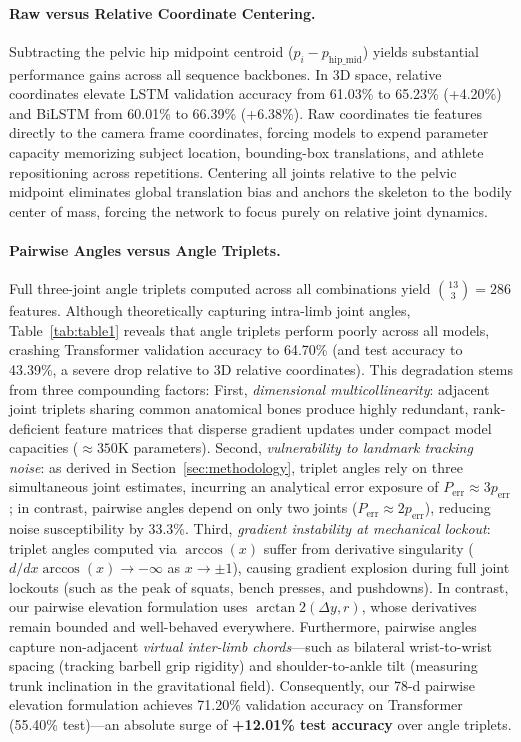 \documentclass[runningheads]{llncs}
\begin{document}
\paragraph{Raw versus Relative Coordinate Centering.} Subtracting the pelvic hip midpoint centroid ($p_i - p_{\text{hip\_mid}}$) yields substantial performance gains across all sequence backbones. In 3D space, relative coordinates elevate LSTM validation accuracy from 61.03\% to 65.23\% (+4.20\%) and BiLSTM from 60.01\% to 66.39\% (+6.38\%). Raw coordinates tie features directly to the camera frame coordinates, forcing models to expend parameter capacity memorizing subject location, bounding-box translations, and athlete repositioning across repetitions. Centering all joints relative to the pelvic midpoint eliminates global translation bias and anchors the skeleton to the bodily center of mass, forcing the network to focus purely on relative joint dynamics.

\paragraph{Pairwise Angles versus Angle Triplets.} Full three-joint angle triplets computed across all combinations yield $\binom{13}{3} = 286$ features. Although theoretically capturing intra-limb joint angles, Table~\ref{tab:table1} reveals that angle triplets perform poorly across all models, crashing Transformer validation accuracy to 64.70\% (and test accuracy to 43.39\%, a severe drop relative to 3D relative coordinates). This degradation stems from three compounding factors:
First, \textit{dimensional multicollinearity}: adjacent joint triplets sharing common anatomical bones produce highly redundant, rank-deficient feature matrices that disperse gradient updates under compact model capacities ($\approx 350\text{K}$ parameters).
Second, \textit{vulnerability to landmark tracking noise}: as derived in Section~\ref{sec:methodology}, triplet angles rely on three simultaneous joint estimates, incurring an analytical error exposure of $P_{\text{err}} \approx 3p_{\text{err}}$; in contrast, pairwise angles depend on only two joints ($P_{\text{err}} \approx 2p_{\text{err}}$), reducing noise susceptibility by 33.3\%.
Third, \textit{gradient instability at mechanical lockout}: triplet angles computed via $\arccos(x)$ suffer from derivative singularity ($d/dx \arccos(x) \to -\infty$ as $x \to \pm 1$), causing gradient explosion during full joint lockouts (such as the peak of squats, bench presses, and pushdowns). In contrast, our pairwise elevation formulation uses $\arctan2(\Delta y, r)$, whose derivatives remain bounded and well-behaved everywhere.
Furthermore, pairwise angles capture non-adjacent \textit{virtual inter-limb chords}---such as bilateral wrist-to-wrist spacing (tracking barbell grip rigidity) and shoulder-to-ankle tilt (measuring trunk inclination in the gravitational field). Consequently, our 78-d pairwise elevation formulation achieves 71.20\% validation accuracy on Transformer (55.40\% test)---an absolute surge of \textbf{+12.01\% test accuracy} over angle triplets.
\end{document}
